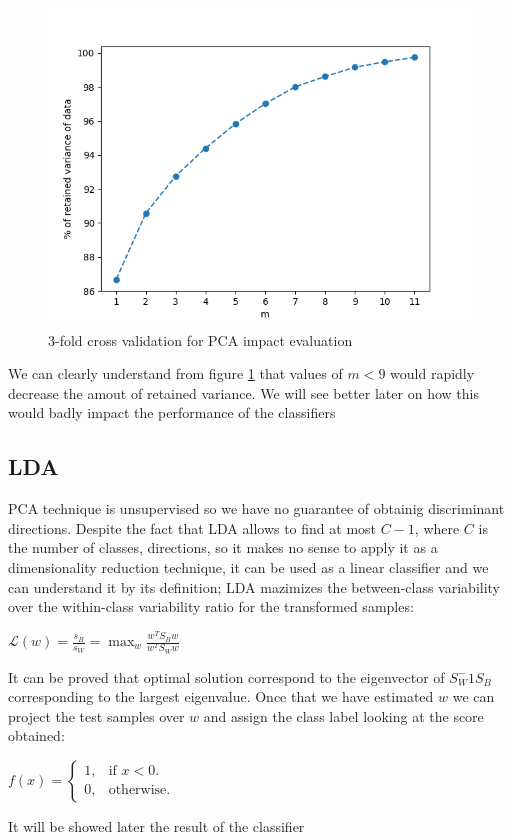 \documentclass[10pt, a4paper, twocolumn]{article} %
\begin{document}
\begin{figure}[ht!]
	\includegraphics[width=\linewidth]{./Pictures/FeaturesAnalysis/pca.png}
	\caption{3-fold cross validation for PCA impact evaluation}
	\label{pca} 
\end{figure}
We can clearly understand from figure \ref{pca} that values of $m < 9$ would rapidly
decrease the amout of retained variance. We will see better later on how this would 
badly impact the performance of the classifiers

\subsection{LDA}
PCA technique is unsupervised so we have no guarantee of obtainig discriminant directions.
Despite the fact that LDA allows to find at most $C - 1$, where $C$ is the number of classes,
directions, so it makes no sense to apply it as a dimensionality reduction technique, it can
be used as a linear classifier and we can understand it by its definition; LDA mazimizes the
between-class variability over the within-class variability ratio for the transformed samples:
\begin{center}
	\begin{math}
		\mathcal{L}(w) = \frac{s_{B}}{s_{W}} = \max_w \frac{w^TS_{B}w}{w^TS_{W}w}
	\end{math}
\end{center}
It can be proved that optimal solution correspond to the eigenvector of $S_{W}^-1S_{B}$ 
corresponding to the largest eigenvalue. Once that we have estimated $w$ we can project
the test samples over $w$ and assign the class label looking at the score obtained:\\
\begin{center}
	\begin{math}
		f(x)=\left\{
		\begin{array}{ll}
			1, & \mbox{if $x<0$}.\\
			0, & \mbox{otherwise}.
		\end{array}
		\right.
	\end{math}
\end{center}
It will be showed later the result of the classifier
\end{document}
